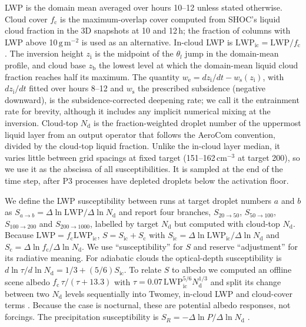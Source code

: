 \documentclass[acp, manuscript]{copernicus}
\newcommand{\Nd}{N_\mathrm{d}}
\newcommand{\LWP}{\mathrm{LWP}}
\newcommand{\we}{w_\mathrm{e}}
\newcommand{\zi}{z_\mathrm{i}}
\newcommand{\zb}{z_\mathrm{b}}
\newcommand{\Slow}{S_{20\rightarrow50}}
\newcommand{\Smid}{S_{50\rightarrow100}}
\newcommand{\Shigh}{S_{100\rightarrow200}}
\newcommand{\Svhigh}{S_{200\rightarrow1000}}
\newcommand{\cmthree}{\mathrm{cm^{-3}}}
\newcommand{\gmm}{\mathrm{g\,m^{-2}}}
\begin{document}
LWP is the domain mean averaged over hours 10--12 unless stated otherwise. Cloud cover $f_\mathrm{c}$ is the maximum-overlap cover computed from SHOC's liquid cloud fraction in the 3D snapshots at 10 and 12\,h; the fraction of columns with LWP above 10\,$\gmm$ is used as an alternative. In-cloud LWP is $\LWP_\mathrm{ic}=\LWP/f_\mathrm{c}$. The inversion height $\zi$ is the midpoint of the $\theta_l$ jump in the domain-mean profile, and cloud base $\zb$ the lowest level at which the domain-mean liquid cloud fraction reaches half its maximum. The quantity $\we=d\zi/dt-w_\mathrm{s}(\zi)$, with $d\zi/dt$ fitted over hours 8--12 and $w_\mathrm{s}$ the prescribed subsidence (negative downward), is the subsidence-corrected deepening rate; we call it the entrainment rate for brevity, although it includes any implicit numerical mixing at the inversion. Cloud-top $\Nd$ is the fraction-weighted droplet number of the uppermost liquid layer from an output operator that follows the AeroCom convention, divided by the cloud-top liquid fraction. Unlike the in-cloud layer median, it varies little between grid spacings at fixed target (151--162\,$\cmthree$ at target 200), so we use it as the abscissa of all susceptibilities. It is sampled at the end of the time step, after P3 processes have depleted droplets below the activation floor.

We define the LWP susceptibility between runs at target droplet numbers $a$ and $b$ as $S_{a\rightarrow b}=\Delta\ln\LWP/\Delta\ln\Nd$ and report four branches, $\Slow$, $\Smid$, $\Shigh$ and $\Svhigh$, labelled by target $\Nd$ but computed with cloud-top $\Nd$. Because $\LWP=f_\mathrm{c}\LWP_\mathrm{ic}$, $S=S_\mathrm{ic}+S_\mathrm{c}$ with $S_\mathrm{ic}=\Delta\ln\LWP_\mathrm{ic}/\Delta\ln\Nd$ and $S_\mathrm{c}=\Delta\ln f_\mathrm{c}/\Delta\ln\Nd$. We use ``susceptibility'' for $S$ and reserve ``adjustment'' for its radiative meaning. For adiabatic clouds the optical-depth susceptibility is $d\ln\tau/d\ln\Nd=1/3+(5/6)S_\mathrm{ic}$. To relate $S$ to albedo we computed an offline scene albedo $f_\mathrm{c}\,\tau/(\tau+13.3)$ with $\tau=0.07\,\LWP_\mathrm{ic}^{5/6}\Nd^{1/3}$ and split its change between two $\Nd$ levels sequentially into Twomey, in-cloud LWP and cloud-cover terms \citep{platnick1994}. Because the case is nocturnal, these are potential albedo responses, not forcings. The precipitation susceptibility is $S_R=-\Delta\ln P/\Delta\ln\Nd$ \citep{terai2012}.
\end{document}
